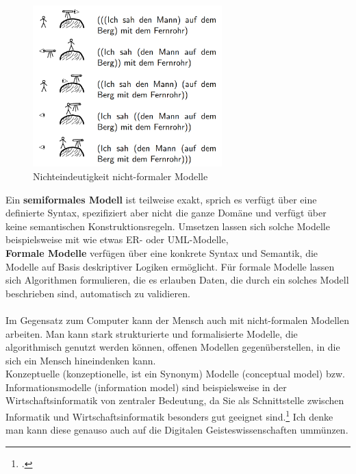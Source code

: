 \documentclass[12pt,a4paper]{article}
\begin{document}
\begin{figure}[H]
\centering
	\includegraphics[width=0.65\textwidth]{img/fernrohr.png}  
    \caption[Nichteindeutigkeit nicht-formaler Modelle, KÖNIG Bettina : Vorlesung ''Modellierungsmethoden der Informatik'', \protect\url{http://www.ti.inf.uni-due.de/fileadmin/public/teaching/mod/slides/ws201112/einfuehrung.pdf}, 10.06.2019]{Nichteindeutigkeit nicht-formaler Modelle}\label{fig:fernrohr}
\end{figure} 
Ein \textbf{semiformales Modell} ist teilweise exakt, sprich es verfügt über eine definierte Syntax, spezifiziert aber nicht die ganze Domäne und verfügt über keine semantischen Konstruktionsregeln. Umsetzen lassen sich solche Modelle beispielsweise mit wie etwas ER- oder UML-Modelle,
\\
\textbf{Formale Modelle} verfügen über eine konkrete Syntax und Semantik, die Modelle auf Basis deskriptiver Logiken ermöglicht. Für formale Modelle lassen sich  Algorithmen formulieren, die es erlauben Daten, die durch ein solches Modell beschrieben sind, automatisch zu validieren.
\\
\\
Im Gegensatz zum Computer kann der Mensch auch mit nicht-formalen Modellen arbeiten. Man kann stark strukturierte und formalisierte Modelle, die algorithmisch genutzt werden können, offenen Modellen gegenüberstellen, in die sich ein Mensch hineindenken kann.
\\
Konzeptuelle (konzeptionelle, ist ein Synonym) Modelle (conceptual model) bzw. Informationsmodelle (information model) sind beispielsweise in der Wirtschaftsinformatik von zentraler Bedeutung, da Sie als Schnittstelle zwischen Informatik und Wirtschaftsinformatik besonders gut geeignet sind.\footcite[][S.44-47]{kobler2010qualitat} Ich denke man kann diese genauso auch auf die Digitalen Geisteswissenschaften ummünzen.
\end{document}
